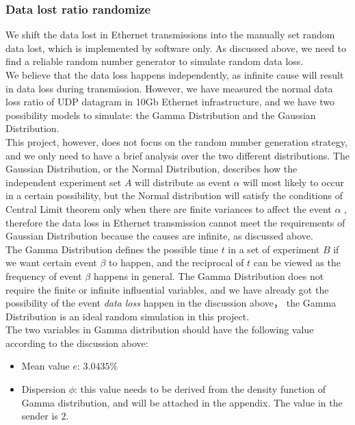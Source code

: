 \documentclass[11pt,openright,a4paper]{report}
\begin{document}
\subsubsection{Data lost ratio randomize}
We shift the data lost in Ethernet transmissions into the manually set random data lost, which is implemented by software only. As discussed above, we need to find a reliable random number generator to simulate random data loss.\\
We believe that the data loss happens independently, as infinite cause will result in data loss during transmission. However, we have measured the normal data loss ratio of UDP datagram in 10Gb Ethernet infrastructure, and we have two possibility models to simulate: the Gamma Distribution and the Gaussian Distribution\cite{dubois2006possibility}.\\
This project, however, does not focus on the random number generation strategy, and we only need to have a brief analysis over the two different distributions. The Gaussian Distribution, or the Normal Distribution, describes how the independent experiment set $A$ will distribute as event $\alpha$ will most likely to occur in a certain possibility\cite{morrison1990multivariate}, but the Normal distribution will satisfy the conditions of Central Limit theorem only when there are finite variances to affect the event $\alpha$ \cite{rosenblatt1956central}, therefore the data loss in Ethernet transmission cannot meet the requirements of Gaussian Distribution because the causes are infinite, as discussed above.\\
The Gamma Distribution defines the possible time $t$ in a set of experiment $B$ if we want certain event $\beta$ to happen, and the reciprocal of $t$ can be viewed as the frequency of event $\beta$ happens in general\cite{stacy1962generalization}. The Gamma Distribution does not require the finite or infinite influential variables, and we have already got the possibility of the event \textit{data loss} happen in the discussion above， the Gamma Distribution is an ideal random simulation in this project.\\
The two variables in Gamma distribution should have the following value according to the discussion above:
\begin{itemize}
	\item Mean value $e$: $3.0435\%$
	\item Dispersion $\phi$: this value needs to be derived from the density function of Gamma distribution, and will be attached in the appendix. The value in the sender is $2$.
\end{itemize} 
\end{document}
